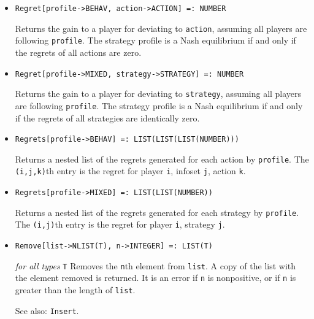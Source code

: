\begin{itemize}
\item{}
\protect \large \begin{verbatim}
Regret[profile->BEHAV, action->ACTION] =: NUMBER 
\end{verbatim} \normalsize

\bd
Returns the gain to a player for deviating to \verb+action+, assuming
all players are following \verb+profile+.  The strategy profile is
a Nash equilibrium if and only if the regrets of all actions are zero.
\ed

\item{}
\protect \large \begin{verbatim}
Regret[profile->MIXED, strategy->STRATEGY] =: NUMBER 
\end{verbatim} \normalsize

\bd
Returns the gain to a player for deviating to \verb+strategy+, assuming
all players are following \verb+profile+.  The strategy profile is
a Nash equilibrium if and only if the regrets of all strategies are
identically zero.
\ed

\item{}
\protect \large \begin{verbatim}
Regrets[profile->BEHAV] =: LIST(LIST(LIST(NUMBER))) 
\end{verbatim} \normalsize

\bd
Returns a nested list of the regrets generated for each action by
\verb+profile+.  The \verb+(i,j,k)+th entry is the regret for player
\verb+i+, infoset \verb+j+, action \verb+k+.
\ed

\item{}
\protect \large \begin{verbatim}
Regrets[profile->MIXED] =: LIST(LIST(NUMBER)) 
\end{verbatim} \normalsize

\bd
Returns a nested list of the regrets generated for each strategy by
\verb+profile+.  The \verb+(i,j)+th entry is the regret for player
\verb+i+, strategy \verb+j+.
\ed

\item{}
\protect \large \begin{verbatim}
Remove[list->NLIST(T), n->INTEGER] =: LIST(T) 
\end{verbatim}\normalsize

{\it for all types} {\tt T}
\bd
Removes the \verb+n+th element from \verb+list+.  A copy of the list
with the element removed is returned.  It is an error if \verb+n+
is nonpositive, or if \verb+n+ is greater than the length of \verb+list+.
\item [See also:] \verb+Insert+.
\ed


\end{itemize}
